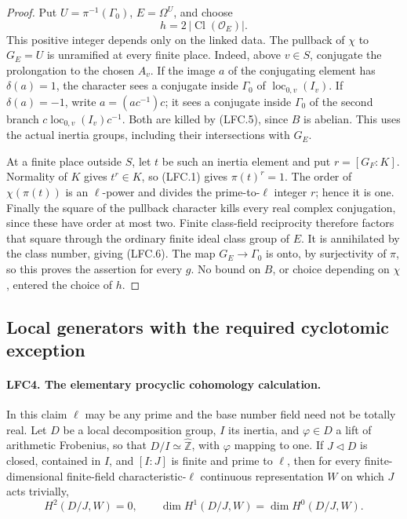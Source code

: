 \documentclass[11pt,a4paper]{article}
\numberwithin{equation}{section}
\theoremstyle{remark}\newtheorem{remark}[theorem]{Remark}
\begin{document}
\begin{proof}
Put \(U=\pi^{-1}(\Gamma_0)\), \(E=\Omega^U\), and choose
\[
                  h=2\,|\operatorname{Cl}(\mathcal O_E)|.
                                                        \tag{LFC.6}
\]
This positive integer depends only on the linked data.
The pullback of \(\chi\) to \(G_E=U\) is unramified at every
finite place.  Indeed, above \(v\in S\), conjugate the
prolongation to the chosen \(A_v\).
If the image \(a\) of the conjugating element has
\(\delta(a)=1\), the character sees a conjugate inside
\(\Gamma_0\) of \(\operatorname{loc}_{0,v}(I_v)\).
If \(\delta(a)=-1\), write \(a=(ac^{-1})c\);
it sees a conjugate inside \(\Gamma_0\) of the second branch
\(c\operatorname{loc}_{0,v}(I_v)c^{-1}\).
Both are killed by (LFC.5), since \(B\) is abelian.
This uses the actual inertia groups, including their
intersections with \(G_E\).

At a finite place outside \(S\), let \(t\) be such an inertia
element and put \(r=[G_F:K]\).  Normality of \(K\) gives
\(t^r\in K\), so (LFC.1) gives \(\pi(t)^r=1\).
The order of \(\chi(\pi(t))\) is an \(\ell\)-power and divides
the prime-to-\(\ell\) integer \(r\); hence it is one.
Finally the square of the pullback character kills every
real complex conjugation, since these have order at most two.
Finite class-field reciprocity therefore factors that square
through the ordinary finite ideal class group of \(E\).
It is annihilated by the class number, giving (LFC.6).
The map \(G_E\to\Gamma_0\) is onto, by surjectivity of \(\pi\),
so this proves the assertion for every \(g\).
No bound on \(B\), or choice depending on \(\chi\), entered
the choice of \(h\).
\end{proof}

\subsection{Local generators with the required cyclotomic exception}

\paragraph{LFC4. The elementary procyclic cohomology calculation.}
\label{claim:LFC4}
In this claim \(\ell\) may be any prime and the base number
field need not be totally real.
Let \(D\) be a local decomposition group, \(I\) its inertia,
and \(\varphi\in D\) a lift of arithmetic Frobenius, so that
\(D/I\simeq\widehat{\mathbb Z}\), with \(\varphi\) mapping to
one.  If \(J\triangleleft D\) is closed, contained in \(I\),
and \([I:J]\) is finite and prime to \(\ell\), then for every
finite-dimensional finite-field characteristic-\(\ell\)
continuous representation \(W\) on which \(J\) acts trivially,
\[
 H^2(D/J,W)=0,\qquad
 \dim H^1(D/J,W)=\dim H^0(D/J,W).                         \tag{LFC.7}
\]
\end{document}
